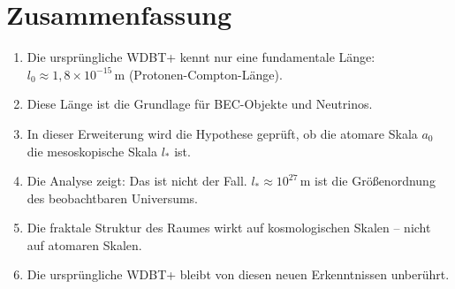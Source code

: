 \section{Zusammenfassung}

\begin{enumerate}
    \item Die ursprüngliche WDBT+ kennt nur eine fundamentale Länge: \( l_0 \approx 1,8 \times 10^{-15} \, \text{m} \) (Protonen-Compton-Länge).
    \item Diese Länge ist die Grundlage für BEC-Objekte und Neutrinos.
    \item In dieser Erweiterung wird die Hypothese geprüft, ob die atomare Skala \( a_0 \) die mesoskopische Skala \( l_* \) ist.
    \item Die Analyse zeigt: Das ist nicht der Fall. \( l_* \approx 10^{27} \, \text{m} \) ist die Größenordnung des beobachtbaren Universums.
    \item Die fraktale Struktur des Raumes wirkt auf kosmologischen Skalen – nicht auf atomaren Skalen.
    \item Die ursprüngliche WDBT+ bleibt von diesen neuen Erkenntnissen unberührt.
\end{enumerate}
